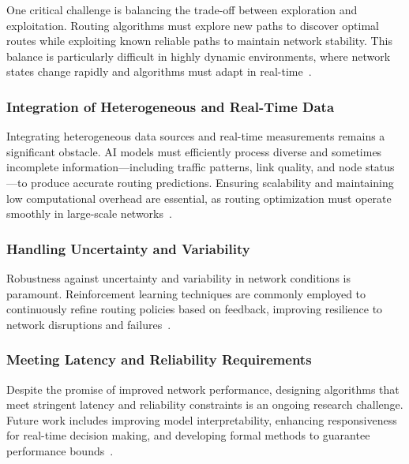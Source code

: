 \documentclass[sigconf]{acmart}
\begin{document}
One critical challenge is balancing the trade-off between exploration and exploitation. Routing algorithms must explore new paths to discover optimal routes while exploiting known reliable paths to maintain network stability. This balance is particularly difficult in highly dynamic environments, where network states change rapidly and algorithms must adapt in real-time~\cite{}.

\subsubsection{Integration of Heterogeneous and Real-Time Data}

Integrating heterogeneous data sources and real-time measurements remains a significant obstacle. AI models must efficiently process diverse and sometimes incomplete information—including traffic patterns, link quality, and node status—to produce accurate routing predictions. Ensuring scalability and maintaining low computational overhead are essential, as routing optimization must operate smoothly in large-scale networks~\cite{}.

\subsubsection{Handling Uncertainty and Variability}

Robustness against uncertainty and variability in network conditions is paramount. Reinforcement learning techniques are commonly employed to continuously refine routing policies based on feedback, improving resilience to network disruptions and failures~\cite{}.

\subsubsection{Meeting Latency and Reliability Requirements}

Despite the promise of improved network performance, designing algorithms that meet stringent latency and reliability constraints is an ongoing research challenge. Future work includes improving model interpretability, enhancing responsiveness for real-time decision making, and developing formal methods to guarantee performance bounds~\cite{}.
\end{document}
